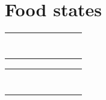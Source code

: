 \documentclass[a4]{article}
\begin{document}
\section{Food states}
\vspace{5mm}
\begin{center}
\begin{tabular}{|c|c|c|c|c|c|c|c|}
  \hline
    &   &   &   &   &   &   &  \\\hline
    &   &   &   &   &   & \cellcolor{red!100}  &  \\\hline
    &   &   &   &   &   &   &  \\\hline
    &   &   &   &   &   & \cellcolor{red!100}  &  \\\hline
    &   & \cellcolor{red!100}  & \cellcolor{red!100}  & \cellcolor{red!100}  & \cellcolor{red!100}  & \cellcolor{red!100}  &  \\\hline
    &   & \cellcolor{red!100}  &   &   &   &   &  \\\hline
    &   & \cellcolor{red!100}  &   &   &   &   &  \\\hline
    &   &   &   &   &   &   &  \\
  \hline
\end{tabular}
\end{center}
\vspace{5mm}
\begin{center}
\begin{tabular}{|c|c|c|c|c|c|c|c|}
  \hline
    &   &   &   &   &   &   &  \\\hline
    &   &   &   &   &   &   &  \\\hline
    &   &   &   &   &   &   &  \\\hline
    &   &   &   &   &   & \cellcolor{red!100}  &  \\\hline
    &   & \cellcolor{red!100}  & \cellcolor{red!100}  & \cellcolor{red!100}  & \cellcolor{red!100}  & \cellcolor{red!100}  &  \\\hline
    &   & \cellcolor{red!100}  &   &   &   &   &  \\\hline
    &   & \cellcolor{red!100}  &   &   &   &   &  \\\hline
    &   &   &   &   &   &   &  \\
  \hline
\end{tabular}
\end{center}
\vspace{5mm}
\end{document}
